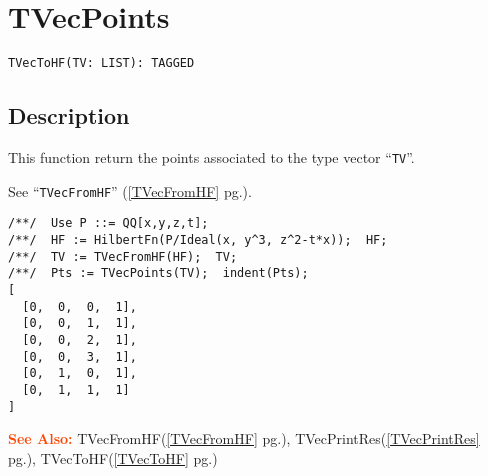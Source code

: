 \documentclass[a4paper]{mybook}
\newenvironment{command}{}{} %
\newcommand\SeeAlso{\par\textcolor{OrangeRed}{\textbf{\large See Also: }}}
\begin{document}
\section{TVecPoints}
\label{TVecPoints}
\begin{command} %


\begin{Verbatim}[label=syntax, rulecolor=\color{MidnightBlue},
frame=single]
TVecToHF(TV: LIST): TAGGED
\end{Verbatim}


\subsection*{Description}

This function return the points associated to the type vector ``\verb&TV&''.
\par 
See ``\verb&TVecFromHF&'' (\ref{TVecFromHF} pg.\pageref{TVecFromHF}).
\begin{Verbatim}[label=example, rulecolor=\color{PineGreen}, frame=single]
/**/  Use P ::= QQ[x,y,z,t];
/**/  HF := HilbertFn(P/Ideal(x, y^3, z^2-t*x));  HF;
/**/  TV := TVecFromHF(HF);  TV;
/**/  Pts := TVecPoints(TV);  indent(Pts);
[
  [0,  0,  0,  1],
  [0,  0,  1,  1],
  [0,  0,  2,  1],
  [0,  0,  3,  1],
  [0,  1,  0,  1],
  [0,  1,  1,  1]
]
\end{Verbatim}


\SeeAlso %
  TVecFromHF(\ref{TVecFromHF} pg.\pageref{TVecFromHF}), 
    TVecPrintRes(\ref{TVecPrintRes} pg.\pageref{TVecPrintRes}), 
    TVecToHF(\ref{TVecToHF} pg.\pageref{TVecToHF})
\end{command} %
\end{document}
